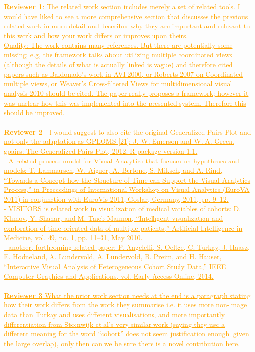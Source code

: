\documentclass[journal]{style/vgtc} 			          %
\newcommand{\com}[1]{\textcolor{orange}{\uline{#1}}}
\begin{document}
\com{\textbf{Reviewer 1}: The related work section includes merely a set of related tools. I would have liked to see a more comprehensive section that discusses the previous related work in more detail and describes why they are important and relevant to this work and how your work differs or improves upon theirs.\\
%
Quality: The work contains many references. But there are potentially some missing; e.g, the framework talks about utilizing multiple coordinated views (although the details of what is actually linked is vague) and therefore cited papers such as Baldonado's work in AVI 2000, or Roberts 2007 on Coordinated multiple views, or Weaver's Cross-filtered Views for multidimensional visual analysis 2010 should be cited. The paper really proposes a framework; however it was unclear how this was implemented into the presented system. Therefore this should be improved.\\\\
%
\textbf{Reviewer 2}
- I would suggest to also cite the original Generalized Pairs Plot and 
not only the adaptation as GPLOMS [21]: J. W. Emerson and W. A. Green. 
gpairs: The Generalized Pairs Plot, 2012. R package version 1.1.\\
%
- A related process model for Visual Analytics that focuses on hypotheses 
and models: T. Lammarsch, W. Aigner, A. Bertone, S. Miksch, and A. Rind, 
“Towards a Concept how the Structure of Time can Support the Visual 
Analytics Process,” in Proceedings of International Workshop on Visual 
Analytics (EuroVA 2011) in conjunction with EuroVis 2011, Goslar, 
Germany, 2011, pp. 9–12.\\
%
- VISITORS is related work in visualization of medical variables of 
cohorts: D. Klimov, Y. Shahar, and M. Taieb-Maimon, “Intelligent 
visualization and exploration of time-oriented data of multiple 
patients,” Artificial Intelligence in Medicine, vol. 49, no. 1, pp. 
11–31, May 2010.\\
%
- another, forthcoming related paper: P. Angelelli, S. Oeltze, C. Turkay, 
J. Haasz, E. Hodneland, A. Lundervold, A. Lundervold, B. Preim, and H. 
Hauser, “Interactive Visual Analysis of Heterogeneous Cohort Study 
Data,” IEEE Computer Graphics and Applications, vol. Early Access 
Online, 2014.\\\\
%
\textbf{Reviewer 3}
What the prior work section needs at the end is a paragraph stating how their work differs from the work they summarise i.e. it uses more non-image data than Turkay and uses different visualisations, and more importantly differentiation from Steenwijk et al’s very similar work (saying they use a different meaning for the word “cohort” does not seem justification enough, given the large overlap), only then can we be sure there is a novel contribution here.}
\end{document}
